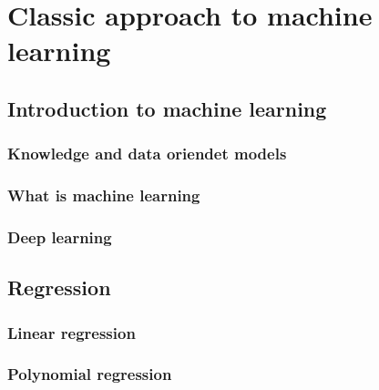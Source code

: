 \chapter{Classic approach to machine learning}


\section{Introduction to machine learning}

\subsection{Knowledge and data oriendet models}

\subsection{What is machine learning}

\subsection{Deep learning}


\section{Regression}

\subsection{Linear regression}

\subsection{Polynomial regression}

